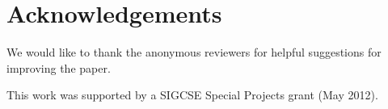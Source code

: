 \documentclass{sig-alternate}
\begin{document}
%
%
%
%
%
%
%
%
%



  

\section{Acknowledgements}

We would like to thank the anonymous reviewers for helpful suggestions
for improving the paper.

This work was supported by a SIGCSE Special Projects grant (May 2012).
\end{document}
